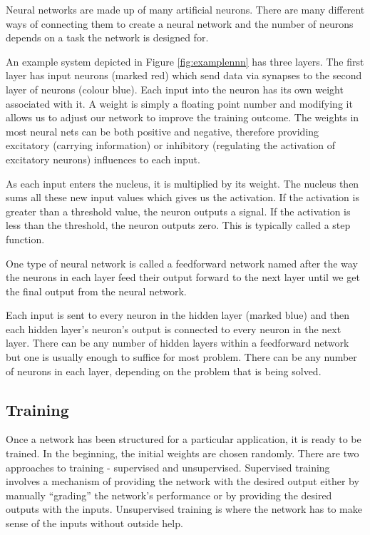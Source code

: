 Neural networks are made up of many artificial neurons. There are many different ways of connecting them to create a neural network and the number of neurons depends on a task the network is designed for.

An example system depicted in Figure \ref{fig:examplennn} has three layers. The first layer has input neurons (marked red) which send data via synapses to the second layer of neurons (colour blue). Each input into the neuron has its own weight associated with it. A weight is simply a floating point number and modifying it allows us to adjust our network to improve the training outcome. The weights in most neural nets can be both positive and negative, therefore providing excitatory (carrying information) or inhibitory (regulating the activation of excitatory neurons) influences to each input. 

As each input enters the nucleus, it is multiplied by its weight. The nucleus then sums all these new input values which gives us the activation. If the activation is greater than a threshold value, the neuron outputs a signal. If the activation is less than the threshold, the neuron outputs zero. This is typically called a step function.

One type of neural network is called a feedforward network named after the way the neurons in each layer feed their output forward to the next layer until we get the final output from the neural network. 
 
Each input is sent to every neuron in the hidden layer (marked blue) and then each hidden layer’s neuron’s output is connected to every neuron in the next layer. There can be any number of hidden layers within a feedforward network but one is usually enough to suffice for most problem. There can be any number of neurons in each layer, depending on the problem that is being solved.

\vspace{10pt}

\subsection{Training}
Once a network has been structured for a particular application, it is ready to be trained. In the beginning, the initial weights are chosen randomly. 
There are two approaches to training - supervised and unsupervised. Supervised training involves a mechanism of providing the network with the desired output either by manually ``grading'' the network's performance or by providing the desired outputs with the inputs. Unsupervised training is where the network has to make sense of the inputs without outside help.

